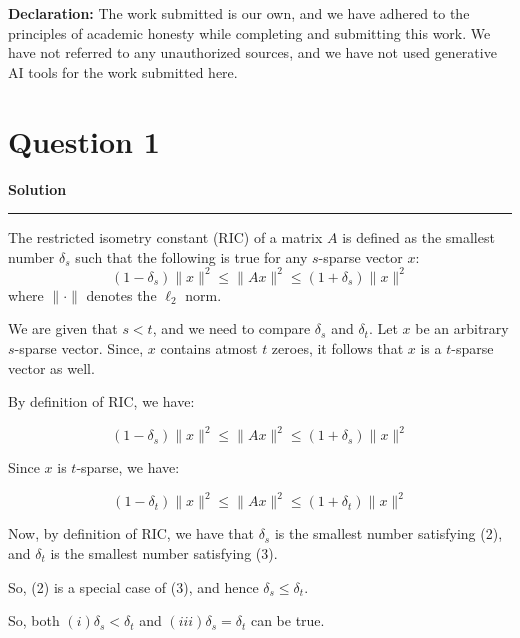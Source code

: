 \documentclass[a4paper,12pt]{article}
\title{\cooltitle{CS754 Assignment-1}}
\author{{\bf Saksham Rathi, Ekansh Ravi Shankar, Kshitij Vaidya}}
\date{}
\newenvironment{solution}[2][]{%
    \begin{mdframed}[linecolor=blue!70!black, linewidth=2pt, roundcorner=10pt, backgroundcolor=yellow!10!white, skipabove=12pt, skipbelow=12pt]%
        \textbf{\large #2}
        \par\noindent\rule{\textwidth}{0.4pt}
}{
    \end{mdframed}
}
\begin{document}
\maketitle
\textbf{Declaration:} The work submitted is our own, and
we have adhered to the principles of academic honesty while completing and submitting this work. We have not referred to any unauthorized sources, and we have not used generative AI tools for the work submitted here.



\section*{Question 1}

\begin{solution}{Solution}
  The restricted isometry constant (RIC) of a
 matrix $A$ is defined as the smallest number $\delta_s$ such that the following is true for any $s$-sparse vector $x$:
  \begin{equation}
    (1-\delta_s) \lVert x \rVert^2 \leq \lVert Ax \rVert^2 \leq (1+\delta_s) \lVert x \rVert^2
  \end{equation}
  where $\lVert \cdot \rVert$ denotes the $\ell_2$ norm. 

  We are given that $s < t$, and we need to compare $\delta_s$ and $\delta_t$. Let $x$ be an arbitrary $s$-sparse vector. Since, $x$ contains atmost $t$ zeroes, it follows that $x$ is a $t$-sparse vector as well. 

  By definition of RIC, we have:

  \begin{equation}
    (1-\delta_s) \lVert x \rVert^2 \leq \lVert Ax \rVert^2 \leq (1+\delta_s) \lVert x \rVert^2
  \end{equation}

  Since $x$ is $t$-sparse, we have:

  \begin{equation}
    (1-\delta_t) \lVert x \rVert^2 \leq \lVert Ax \rVert^2 \leq (1+\delta_t) \lVert x \rVert^2
  \end{equation}

  Now, by definition of RIC, we have that $\delta_s$ is the smallest number satisfying (2), and $\delta_t$ is the smallest number satisfying (3). 
  
  So, (2) is a special case of (3), and hence $\delta_s \leq \delta_t$.

  So, both $(i) \delta_s < \delta_t$ and $(iii) \delta_s = \delta_t$ can be true.

\end{solution}
\end{document}
